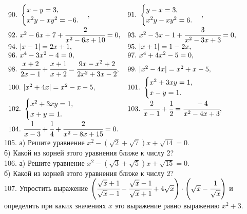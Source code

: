 \documentclass[12pt]{article}
\begin{document}
$\begin{array}{ll}
90.\ \begin{cases}
x-y=3,\\
x^2y-xy^2=-6.
\end{cases},&
91.\ \begin{cases}
y-x=3,\\
x^2y-xy^2=6.
\end{cases},\\
92.\ x^2-6x+7+\cfrac{2}{x^2-6x+10}=0,&
93.\ x^2-3x-1+\cfrac{3}{x^2-3x+3}=0,\\
94.\ |x-1|=2x+1,&
95.\ |x+1|=1-2x,\\
96.\ x^4-3x^2-4=0,&
97.\ x^4+4x^2-5=0, \\
98.\ \cfrac{x+2}{2x-1}+\cfrac{x+1}{x+2}=\cfrac{9x-x^2+2}{2x^2+3x-2},&
99.\ |x^2-4x|=x^2+x-5,\\
100.\ |x^2+4x|=x^2-x-5,&
101.\ \begin{cases} x^2+3xy=1,\\ x-y=1.\end{cases}\\
102.\ \begin{cases} x^2+3xy=1,\\ x+y=1.\end{cases}&
103.\ \cfrac{2}{x-1}+\cfrac{1}{2}=\cfrac{-4}{x^2-4x+3},\\
104.\ \cfrac{1}{x-3}+\cfrac{1}{4}+\cfrac{2}{x^2-8x+15}=0.
\end{array}$\\
105. а) Решите уравнение $x^2-(\sqrt{2}+\sqrt{7})x+\sqrt{14}=0.$\\
б) Какой из корней этого уравнения ближе к числу 2?\\
106. а) Решите уравнение $x^2-(\sqrt{3}+\sqrt{5})x+\sqrt{15}=0.$\\
б) Какой из корней этого уравнения ближе к числу 2?\\
107. Упростить выражение $\left(\cfrac{\sqrt{x}+1}{\sqrt{x}-1}-\cfrac{\sqrt{x}-1}{\sqrt{x}+1}+4\sqrt{x}\right)\cdot\left(\sqrt{x}-\cfrac{1}{\sqrt{x}}\right)$ и определить при каких значениях $x$ это выражение равно выражению $x^2+3.$\\
\end{document}
